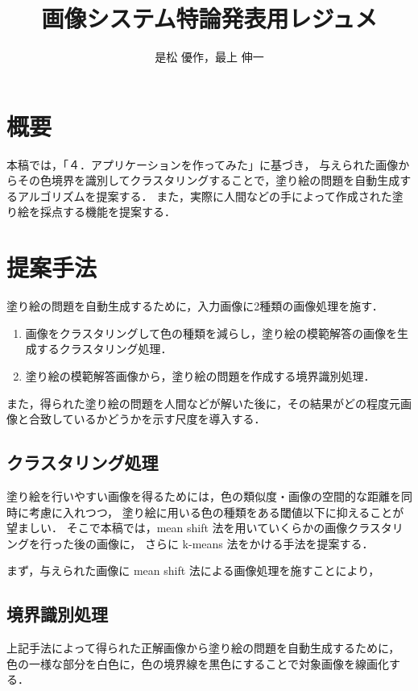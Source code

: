 \documentclass[dvipdfmx]{jsarticle}
\begin{document}
\title{画像システム特論発表用レジュメ}
\author{是松 優作，最上 伸一}

\setlength{\baselineskip}{4.4mm}	%
\maketitle
\thispagestyle{empty}
\pagestyle{empty}

\section{概要}
本稿では，「４．アプリケーションを作ってみた」に基づき，
与えられた画像からその色境界を識別してクラスタリングすることで，塗り絵の問題を自動生成するアルゴリズムを提案する．
また，実際に人間などの手によって作成された塗り絵を採点する機能を提案する．

\section{提案手法}

塗り絵の問題を自動生成するために，入力画像に2種類の画像処理を施す．
\begin{enumerate}
\item 画像をクラスタリングして色の種類を減らし，塗り絵の模範解答の画像を生成する{\gtfamily クラスタリング処理}．
\item 塗り絵の模範解答画像から，塗り絵の問題を作成する{\gtfamily 境界識別処理}．
\end{enumerate}

また，得られた塗り絵の問題を人間などが解いた後に，その結果がどの程度元画像と合致しているかどうかを示す尺度を導入する．

\subsection{クラスタリング処理}
塗り絵を行いやすい画像を得るためには，色の類似度・画像の空間的な距離を同時に考慮に入れつつ，
塗り絵に用いる色の種類をある閾値以下に抑えることが望ましい．
そこで本稿では，mean shift 法を用いていくらかの画像クラスタリングを行った後の画像に，
さらに k-means 法をかける手法を提案する．

まず，与えられた画像に mean shift 法による画像処理を施すことにより，

\subsection{境界識別処理}
上記手法によって得られた正解画像から塗り絵の問題を自動生成するために，
色の一様な部分を白色に，色の境界線を黒色にすることで対象画像を線画化する．
\end{document}
